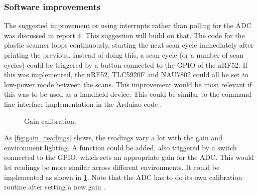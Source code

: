 \documentclass[12pt, a4paper]{article}
\begin{document}
        \subsubsection{Software improvements}
            
            The suggested improvement or using interrupts rather than polling for the ADC was discussed in report 4. This suggestion will build on that.
            The code for the plastic scanner loops continuously, starting the next scan cycle immediately after printing the previous. Instead of doing this,
            a scan cycle (or a number of scan cycles) could be triggered by a button connected to the GPIO of the nRF52. If this was implemented, the nRF52,
            TLC5920F and NAU7802 could all be set to low-power mode between the scans. This improvement would be most relevant if this was to be used as a
            handheld device. This could be similar to the command line interface implementation in the Arduino code \cite{arduinocode}.\par
            \begin{figure}
                \centering
                \vspace{-0pt}
                \caption{Gain calibration.}
                \label{fig:gaincalibration}
            \end{figure}
            As \cref{fig:gain_readings} shows, the readings vary a lot with the gain and environment lighting. A function could be added, also triggered by
            a switch connected to the GPIO, which sets an appropriate gain for the ADC. This would let readings be more similar across different environments.
            It could be implemented as shown in \cref{fig:gaincalibration}. Note that the ADC has to do its own calibration routine after setting a new gain \cite{nau}.
        
\end{document}
